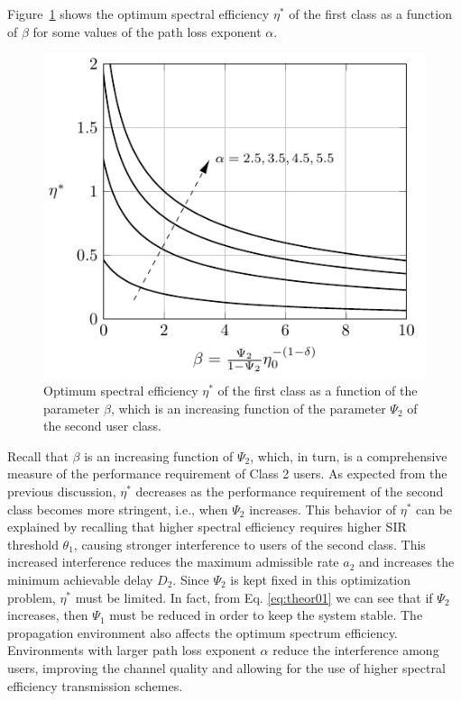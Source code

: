 Figure~\ref{fig:optimum_partition} shows the optimum spectral efficiency $\eta^*$ of the first class as a function of $\beta$ for some values of the path loss exponent $\alpha$.
\begin{figure}[!t]
	\centering
	\includegraphics[]{./Figures/Ch7_optimum_partition.pdf}	
	\caption{Optimum spectral efficiency $\eta^*$ of the first class as a function of the parameter $\beta$, which is an increasing function of the parameter $\Psi_2$ of the second user class.}
	\label{fig:optimum_partition}
\end{figure}
Recall that $\beta$ is an increasing function of $\Psi_2$, which, in turn, is a comprehensive measure of the performance requirement of Class 2 users. As expected from the previous discussion, $\eta^*$ decreases as the performance requirement of the second class becomes more stringent, i.e., when $\Psi_2$ increases. This behavior of $\eta^*$ can be explained by recalling that higher spectral efficiency requires higher SIR threshold $\theta_1$, causing stronger interference to users of the second class.
%
This increased interference reduces the maximum admissible rate $a_2$ and increases the minimum achievable delay $D_2$. Since $\Psi_2$ is kept fixed in this optimization problem, $\eta^*$ must be limited. In fact, from Eq. \eqref{eq:theor01} we can see that if $\Psi_2$ increases, then $\Psi_1$ must be reduced in order to keep the system stable.
%
The propagation environment also affects the optimum spectrum efficiency. Environments with larger path loss exponent $\alpha$ reduce the interference among users, improving the channel quality and allowing for the use of higher spectral efficiency transmission schemes.

